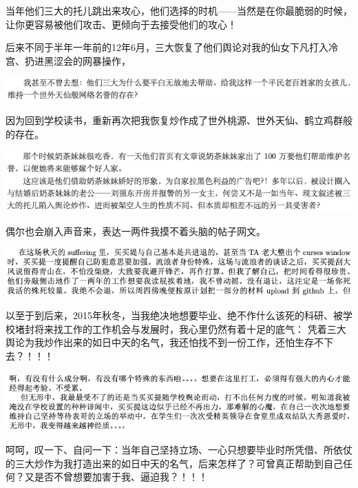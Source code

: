 \documentclass[9pt, b5paper]{article}
\begin{document}
当年他们三大的托儿跳出来攻心，他们选择的时机——当然是在你最脆弱的时候，让你更容易被他们攻击、更倾向于去接受他们的攻心！

后来不同于半年一年前的12年6月，三大恢复了他们舆论对我的仙女下凡打入冷宫、扔进黑涩会的网暴操作，

\begin{center}
\includegraphics[width=.9\linewidth]{./pic/backups_plans_20210424_100340.png}
\end{center}

因为回到学校读书，重新再次把我恢复炒作成了世外桃源、世外天仙、鹤立鸡群般的存在。

\begin{center}
\includegraphics[width=.9\linewidth]{./pic/backups_plans_20210424_100357.png}
\end{center}

偶尔也会崩入声音来，表达一两件我摸不着头脑的帖子网文。

\begin{center}
\includegraphics[width=.9\linewidth]{./pic/backups_plans_20210424_103217.png}
\end{center}

以至于到后来，2015年秋冬，当我绝决地想要毕业、绝不作什么该死的科研、被学校堵封将来找工作的工作机会与发展时，我心里仍然有着十足的底气：
凭着三大舆论为我炒作出来的如日中天的名气，我还怕找不到一份工作，还怕生存不下去？！！！

\begin{center}
\includegraphics[width=.9\linewidth]{./pic/backups_plans_20210424_130121.png}
\end{center}

呵呵，叹一下、自问一下：当年自己坚持立场、一心只想要毕业时所凭借、所依仗的三大炒作为我打造出来的如日中天的名气，后来怎样了？可曾真正帮助到自己任何？又是否不曾想要加害于我、逼迫我？！！！
\end{document}
